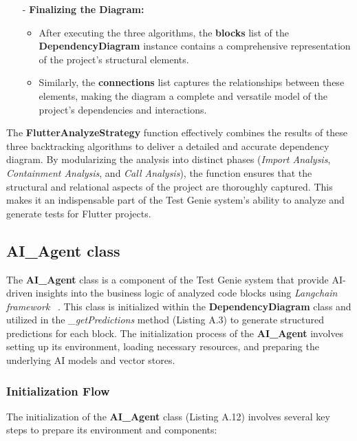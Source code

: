 \begin{itemize}
    \item[-] \textbf{Finalizing the Diagram:}
    \begin{itemize}
        \item After executing the three algorithms, the \textbf{blocks} list of the \textbf{DependencyDiagram} instance contains a comprehensive representation of the project's structural elements.
        \item Similarly, the \textbf{connections} list captures the relationships between these elements, making the diagram a complete and versatile model of the project's dependencies and interactions.
    \end{itemize}
\end{itemize}

The \textbf{FlutterAnalyzeStrategy} function effectively combines the results of these three backtracking algorithms to deliver a detailed and accurate dependency diagram. By modularizing the analysis into distinct phases (\textit{Import Analysis}, \textit{Containment Analysis}, and \textit{Call Analysis}), the function ensures that the structural and relational aspects of the project are thoroughly captured. This makes it an indispensable part of the Test Genie system's ability to analyze and generate tests for Flutter projects.

\subsection{AI\_Agent class}

The \textbf{AI\_Agent} class is a component of the Test Genie system that provide AI-driven insights into the business logic of analyzed code blocks using \textit{Langchain framework} ~\cite{langchain}. This class is initialized within the \textbf{DependencyDiagram} class and utilized in the \textit{\_getPredictions} method (Listing A.3) to generate structured predictions for each block. The initialization process of the \textbf{AI\_Agent} involves setting up its environment, loading necessary resources, and preparing the underlying AI models and vector stores.

\subsubsection{Initialization Flow}

The initialization of the \textbf{AI\_Agent} class (Listing A.12) involves several key steps to prepare its environment and components:

